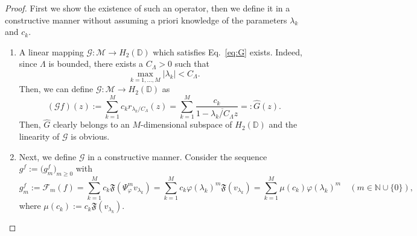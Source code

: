 \documentclass{arxiv}
\newcommand{\funF}{\mathfrak{F}}
\newcommand{\cM}{\mathcal{M}}
\renewcommand{\hat}{\widehat}
\begin{document}
\begin{proof}
First we show the existence of such an operator, then we define it in a constructive manner without assuming a priori knowledge of the parameters $\lambda_k$ and $c_k$.
\begin{enumerate}[label = \alph*)]
\item  A linear mapping $\mathcal{G} : \cM \to H_2(\mathbb{D})$ which satisfies Eq.~\eqref{eq:G} exists. Indeed, since $\Lambda$ is bounded, there exists a $C_{\Lambda} > 0$ such that
\begin{equation}
    \label{eq:cf}
    \max_{k=1,\ldots,M}|\lambda_k| < C_{\Lambda}.
\end{equation}
Then, we can define $\mathcal{G} : \cM \to H_2(\mathbb{D})$ as
\begin{equation*}
    (\mathcal{G}f)(z) := \sum_{k=1}^{M} c_k r_{\lambda_k / C_{\Lambda}}(z) = \sum_{k=1}^{M} \frac{c_k}{1 - \overline{\lambda_k/ C_{\Lambda}}z} =: \hat{G}(z).
\end{equation*}
Then, $\hat{G}$ clearly belongs to an $M$-dimensional subspace of $H_2(\mathbb{D})$ and the linearity of $\mathcal{G}$ is obvious. 

\item Next, we define $\mathcal{G}$ in a constructive manner. %
Consider the sequence $g^f := \big(g_m^f\big)_{m \ge 0}$ with 
\begin{equation*}
    g^{f}_m := \mathcal{F}_m(f) = \sum_{k=1}^M c_k \funF( \Psi_\varphi^m v_{\lambda_k} ) = \sum_{k=1}^M c_k \varphi(\lambda_k)^m \funF( v_{\lambda_k}) = \sum_{k=1}^{M} \mu(c_k) \varphi(\lambda_k)^m\quad (m \in \mathbb{N} \cup \{0\}),
\end{equation*}
where $\mu(c_k) := c_k \funF(v_{\lambda_k})$. 


\end{enumerate}
\end{proof}
\end{document}
